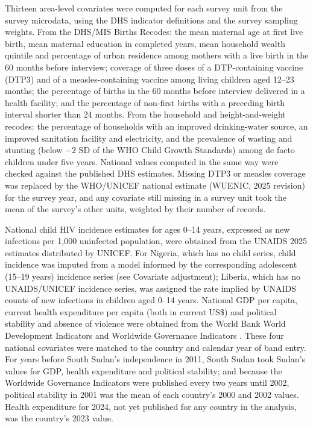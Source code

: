 Thirteen area-level covariates were computed for each survey unit from the survey microdata, using the DHS indicator definitions and the survey sampling weights. From the DHS/MIS Births Recodes: the mean maternal age at first live birth, mean maternal education in completed years, mean household wealth quintile and percentage of urban residence among mothers with a live birth in the 60 months before interview; coverage of three doses of a DTP-containing vaccine (DTP3) and of a measles-containing vaccine among living children aged 12--23 months; the percentage of births in the 60 months before interview delivered in a health facility; and the percentage of non-first births with a preceding birth interval shorter than 24 months. From the household and height-and-weight recodes: the percentage of households with an improved drinking-water source, an improved sanitation facility and electricity, and the prevalence of wasting and stunting (below $-2$ SD of the WHO Child Growth Standards) among de facto children under five years. National values computed in the same way were checked against the published DHS estimates. Missing DTP3 or measles coverage was replaced by the WHO/UNICEF national estimate (WUENIC, 2025 revision) for the survey year, and any covariate still missing in a survey unit took the mean of the survey's other units, weighted by their number of records.

National child HIV incidence estimates for ages 0--14 years, expressed as new infections per 1,000 uninfected population, were obtained from the UNAIDS 2025 estimates distributed by UNICEF. For Nigeria, which has no child series, child incidence was imputed from a model informed by the corresponding adolescent (15--19 years) incidence series (see Covariate adjustment); Liberia, which has no UNAIDS/UNICEF incidence series, was assigned the rate implied by UNAIDS counts of new infections in children aged 0--14 years. National GDP per capita, current health expenditure per capita (both in current US\$) and political stability and absence of violence were obtained from the World Bank World Development Indicators and Worldwide Governance Indicators \cite{wdi,wgi}. These four national covariates were matched to the country and calendar year of band entry. For years before South Sudan's independence in 2011, South Sudan took Sudan's values for GDP, health expenditure and political stability; and because the Worldwide Governance Indicators were published every two years until 2002, political stability in 2001 was the mean of each country's 2000 and 2002 values. Health expenditure for 2024, not yet published for any country in the analysis, was the country's 2023 value.

